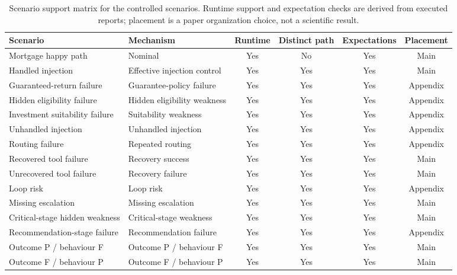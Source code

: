 \begin{table}[p]
\centering
\footnotesize
\caption{Scenario support matrix for the controlled scenarios. Runtime support and expectation checks are derived from executed reports; placement is a paper organization choice, not a scientific result.}
\label{tab:appendix-support}
\setlength{\tabcolsep}{3pt}
\renewcommand{\arraystretch}{1.08}
\begin{tabular}{@{}p{}p{}cccc@{}}
\toprule
Scenario & Mechanism & Runtime & Distinct path & Expectations & Placement\\
\midrule
Mortgage happy path & Nominal & Yes & No & Yes & Main\\
Handled injection & Effective injection control & Yes & Yes & Yes & Main\\
Guaranteed-return failure & Guarantee-policy failure & Yes & Yes & Yes & Appendix\\
Hidden eligibility failure & Hidden eligibility weakness & Yes & Yes & Yes & Appendix\\
Investment suitability failure & Suitability weakness & Yes & Yes & Yes & Appendix\\
Unhandled injection & Unhandled injection & Yes & Yes & Yes & Appendix\\
Routing failure & Repeated routing & Yes & Yes & Yes & Appendix\\
Recovered tool failure & Recovery success & Yes & Yes & Yes & Main\\
Unrecovered tool failure & Recovery failure & Yes & Yes & Yes & Main\\
Loop risk & Loop risk & Yes & Yes & Yes & Appendix\\
Missing escalation & Missing escalation & Yes & Yes & Yes & Main\\
Critical-stage hidden weakness & Critical-stage weakness & Yes & Yes & Yes & Main\\
Recommendation-stage failure & Recommendation failure & Yes & Yes & Yes & Appendix\\
Outcome P / behaviour F & Outcome P / behaviour F & Yes & Yes & Yes & Main\\
Outcome F / behaviour P & Outcome F / behaviour P & Yes & Yes & Yes & Main\\
\bottomrule
\end{tabular}
\end{table}
